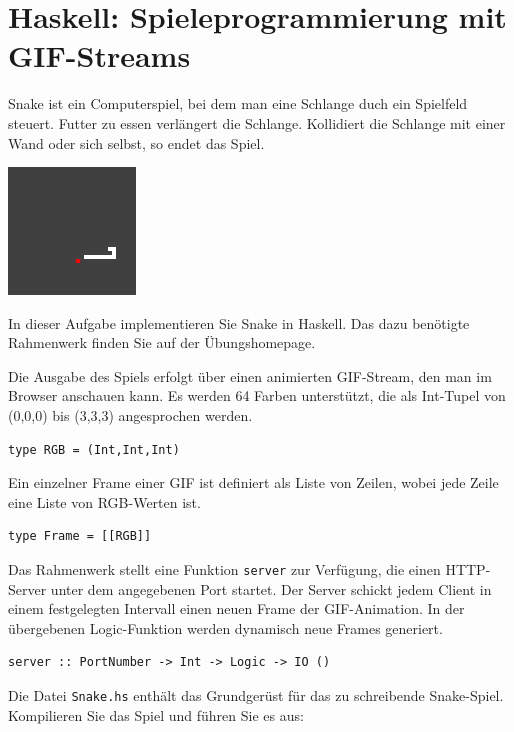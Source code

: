 \documentclass{scrartcl}
\begin{document}
\section{Haskell: Spieleprogrammierung mit GIF-Streams}

Snake ist ein Computerspiel, bei dem man eine Schlange duch ein Spielfeld steuert.
Futter zu essen verlängert die Schlange.
Kollidiert die Schlange mit einer Wand oder sich selbst, so endet das Spiel.

\begin{center}
\includegraphics{snake}
\end{center}

In dieser Aufgabe implementieren Sie Snake in Haskell.
Das dazu benötigte Rahmenwerk finden Sie auf der Übungshomepage.

Die Ausgabe des Spiels erfolgt über einen animierten GIF-Stream, den man im Browser anschauen kann.
Es werden 64 Farben unterstützt, die als Int-Tupel von (0,0,0) bis (3,3,3) angesprochen werden.

\begin{lstlisting}
type RGB = (Int,Int,Int)
\end{lstlisting}

Ein einzelner Frame einer GIF ist definiert als Liste von Zeilen, wobei jede Zeile eine Liste von RGB-Werten ist.

\begin{lstlisting}
type Frame = [[RGB]]
\end{lstlisting}

Das Rahmenwerk stellt eine Funktion \texttt{server} zur Verfügung, die einen HTTP-Server unter dem angegebenen Port startet.
Der Server schickt jedem Client in einem festgelegten Intervall einen neuen Frame der GIF-Animation.
In der übergebenen Logic-Funktion werden dynamisch neue Frames generiert.

\begin{lstlisting}
server :: PortNumber -> Int -> Logic -> IO ()
\end{lstlisting}

Die Datei \texttt{Snake.hs} enthält das Grundgerüst für das zu schreibende Snake-Spiel.
Kompilieren Sie das Spiel und führen Sie es aus:
\end{document}
